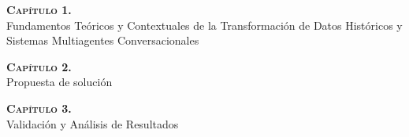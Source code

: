 \documentclass[spanish]{thesis} %
\begin{document}
	
	
	
	\cleardoublepage
	\thispagestyle{empty}
	\vspace*{\fill}
	
	\begin{flushleft}
		\textsc{\Large \bfseries Capítulo 1.\\[1em]}
		\Large{Fundamentos Teóricos y Contextuales de la Transformación de Datos Históricos y Sistemas Multiagentes Conversacionales}
	\end{flushleft}
	
	\vspace*{\fill}
	\clearpage
	
	
	
	\cleardoublepage
	\thispagestyle{empty}
	\vspace*{\fill}
	
	\begin{flushleft}
		\textsc{\Large \bfseries Capítulo 2.\\[1em]}
		\Large{Propuesta de solución}
	\end{flushleft}
	
	\vspace*{\fill}
	\clearpage
	
	
	
	\cleardoublepage
	\thispagestyle{empty}
	\vspace*{\fill}
	
	\begin{flushleft}
		\textsc{\Large \bfseries Capítulo 3.\\[1em]}
		\Large{Validación y Análisis de Resultados}
	\end{flushleft}
	
	\vspace*{\fill}
	\clearpage
	
	
	
	
	\appendix
	
	
	 
	
\end{document}
